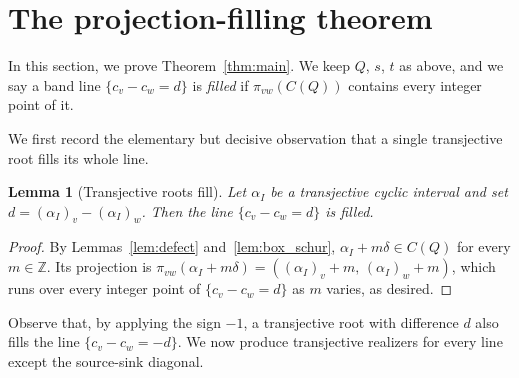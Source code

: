 \documentclass[11pt, a4paper]{amsart}
\newtheorem{lemma}[theorem]{Lemma}
\theoremstyle{definition}
\newcommand{\ZZ}{\mathbb{Z}}
\begin{document}
\section{The projection-filling theorem}
\label{sec:main}

In this section, we prove Theorem~\ref{thm:main}. We keep $Q$, $s$, $t$
as above, and we say a band line $\{c_v - c_w = d\}$ is \emph{filled} if
$\pi_{vw}(C(Q))$ contains every integer point of it.

We first record the elementary but decisive observation that a single
transjective root fills its whole line.

\begin{lemma}[Transjective roots fill]
\label{lem:fills}
Let $\alpha_I$ be a transjective cyclic interval and set
$d = (\alpha_I)_v - (\alpha_I)_w$. Then the line $\{c_v - c_w = d\}$ is
filled.
\end{lemma}

\begin{proof}
By Lemmas~\ref{lem:defect} and~\ref{lem:box_schur},
$\alpha_I + m\delta \in C(Q)$ for every
$m \in \ZZ$. Its projection is
$\pi_{vw}(\alpha_I + m\delta) = ((\alpha_I)_v + m,\, (\alpha_I)_w + m)$,
which runs over every integer point of $\{c_v - c_w = d\}$ as $m$ varies, as
desired.
\end{proof}

Observe that, by applying the sign $-1$, a transjective root with
difference $d$ also fills the line $\{c_v - c_w = -d\}$. We now produce
transjective realizers for every line except the source-sink diagonal.
\end{document}
